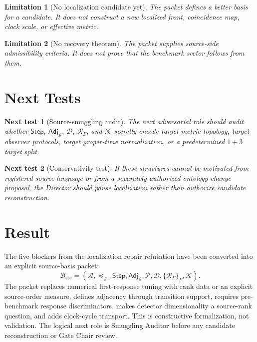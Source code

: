 \documentclass[11pt]{article}
\newcommand{\Sub}{\mathcal{A}}
\newcommand{\Step}{\mathsf{Step}}
\newcommand{\Adj}{\mathsf{Adj}_{\mathcal{S}}}
\newcommand{\RespAlg}{\mathcal{R}_{\Gamma}}
\newcommand{\Basis}{\mathcal{B}_{\mathrm{src}}}
\newtheorem{limitation}{Limitation}
\newtheorem{nexttest}{Next test}
\begin{document}
\begin{limitation}[No localization candidate yet]
The packet defines a better basis for a candidate. It does not construct a
new localized front, coincidence map, clock scale, or effective metric.
\end{limitation}

\begin{limitation}[No recovery theorem]
The packet supplies source-side admissibility criteria. It does not prove
that the benchmark sector follows from them.
\end{limitation}

\section{Next Tests}

\begin{nexttest}[Source-smuggling audit]
The next adversarial role should audit whether \(\Step\), \(\Adj\),
\(\mathcal{D}\), \(\RespAlg\), and \(\mathcal{K}\) secretly encode target
metric topology, target observer protocols, target proper-time normalization,
or a predetermined \(1+3\) target split.
\end{nexttest}

\begin{nexttest}[Conservativity test]
If these structures cannot be motivated from registered source language or
from a separately authorized ontology-change proposal, the Director should
pause localization rather than authorize candidate reconstruction.
\end{nexttest}

\section{Result}

The five blockers from the localization repair refutation have been converted
into an explicit source-basis packet:
\[
\Basis =
(\Sub,\preceq_{\mathcal{S}},\Step,\Adj,\mathcal{P},
\mathcal{D},\{\RespAlg\}_{\Gamma},\mathcal{K}).
\]
The packet replaces numerical first-response tuning with rank data or an
explicit source-order measure, defines adjacency through transition support,
requires pre-benchmark response discriminators, makes detector dimensionality
a source-rank question, and adds clock-cycle transport. This is constructive
formalization, not validation. The logical next role is Smuggling Auditor
before any candidate reconstruction or Gate Chair review.
\end{document}
